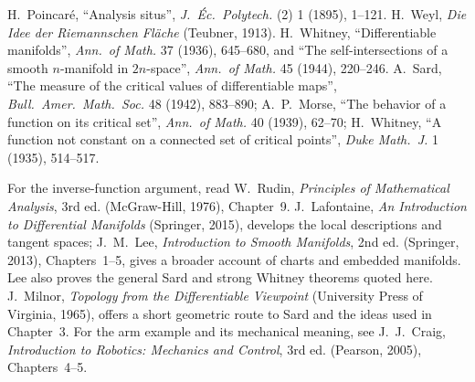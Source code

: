 H.~Poincar\'e, ``Analysis situs'', \emph{J.\ \'Ec.\ Polytech.} (2) 1 (1895), 1--121. H.~Weyl, \emph{Die Idee der Riemannschen Fl\"ache} (Teubner, 1913).
H.~Whitney, ``Differentiable manifolds'', \emph{Ann.\ of Math.} 37 (1936), 645--680, and ``The self-intersections of a smooth $n$-manifold in $2n$-space'',
\emph{Ann.\ of Math.} 45 (1944), 220--246. A.~Sard, ``The measure of the critical values of differentiable maps'', \emph{Bull.\ Amer.\ Math.\ Soc.} 48
(1942), 883--890; A.~P.~Morse, ``The behavior of a function on its critical set'', \emph{Ann.\ of Math.} 40 (1939), 62--70; H.~Whitney, ``A function not
constant on a connected set of critical points'', \emph{Duke Math.\ J.} 1 (1935), 514--517.

For the inverse-function argument, read W.~Rudin, \emph{Principles of Mathematical Analysis}, 3rd ed. (McGraw-Hill, 1976), Chapter~9. J.~Lafontaine, \emph{An Introduction to Differential Manifolds} (Springer, 2015), develops the local descriptions and tangent spaces; J.~M.~Lee, \emph{Introduction to Smooth Manifolds}, 2nd ed. (Springer, 2013), Chapters~1--5, gives a broader account of charts and embedded manifolds. Lee also proves the general Sard and strong Whitney theorems quoted here. J.~Milnor, \emph{Topology from the Differentiable Viewpoint} (University Press of Virginia, 1965), offers a short geometric route to Sard and the ideas used in Chapter~3. For the arm example and its mechanical meaning, see J.~J.~Craig, \emph{Introduction to Robotics: Mechanics and Control}, 3rd ed. (Pearson, 2005), Chapters~4--5.
